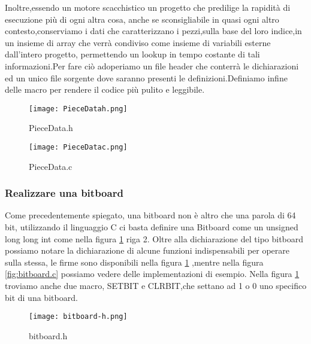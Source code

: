 Inoltre,essendo un motore scacchistico un progetto che predilige la rapidità di esecuzione più di ogni altra cosa,
anche se sconsigliabile in quasi ogni altro contesto,conserviamo i dati che caratterizzano i pezzi,sulla base del loro indice,in un insieme di array che verrà condiviso come insieme di variabili
esterne dall'intero progetto, permettendo un lookup in tempo costante di tali informazioni.Per fare ciò adoperiamo un file header che conterrà le dichiarazioni ed un unico file sorgente dove saranno presenti le
definizioni.Definiamo infine delle macro per rendere il codice più pulito e leggibile.
\begin{figure}[!tbp]
    \centering
    \begin{minipage}{0.4\textwidth}
        \texttt{[image: PieceDatah.png]}
        \caption{PieceData.h}
    \end{minipage}
    \hfill
    \begin{minipage}{0.4\textwidth}
        \texttt{[image: PieceDatac.png]}
        \caption{PieceData.c}
    \end{minipage}
\end{figure}



\subsubsection{Realizzare una bitboard}
Come precedentemente spiegato, una bitboard non è altro che una parola di 64 bit,
utilizzando il linguaggio C ci basta definire una Bitboard come un unsigned long long int come nella figura \ref{bitboard.h} riga 2.
Oltre alla dichiarazione del tipo bitboard possiamo notare la dichiarazione di alcune funzioni indispensabili per operare sulla stessa,
le firme sono disponibili nella figura \ref{bitboard.h} ,mentre nella figura \ref{fig:bitboard.c} possiamo vedere delle implementazioni di esempio.
Nella figura \ref{bitboard.h} troviamo anche due macro, SETBIT e CLRBIT,che settano ad 1 o 0 uno specifico bit di una bitboard.



\vfill
\begin{figure}[!ht]
    \texttt{[image: bitboard-h.png]}
    \caption{ bitboard.h }
    \label{bitboard.h}
\end{figure}

